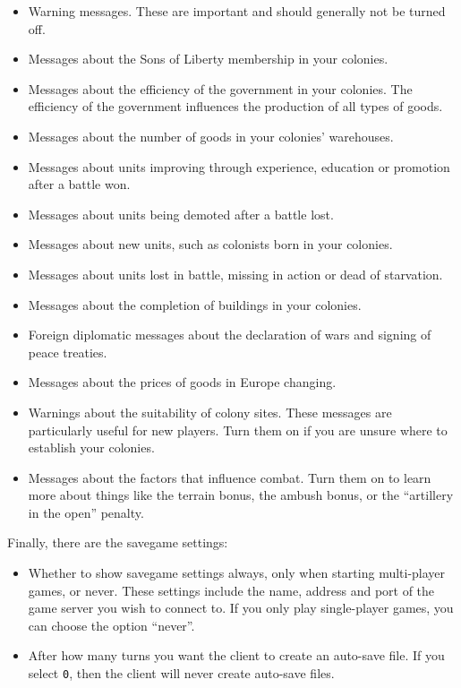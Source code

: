\documentclass[12pt]{article}
\begin{document}
\begin{itemize}
\item Warning messages. These are important and should generally not
be turned off.
\item Messages about the Sons of Liberty membership in your colonies.
\item Messages about the efficiency of the government in your
colonies. The efficiency of the government influences the production
of all types of goods.
\item Messages about the number of goods in your colonies'
warehouses. 
\item Messages about units improving through experience, education or
promotion after a battle won.
\item Messages about units being demoted after a battle lost.
\item Messages about new units, such as colonists born in your
colonies.
\item Messages about units lost in battle, missing in action or dead
of starvation.
\item Messages about the completion of buildings in your colonies.
\item Foreign diplomatic messages about the declaration of wars and
signing of peace treaties.
\item Messages about the prices of goods in Europe changing.
\item Warnings about the suitability of colony sites. These messages
  are particularly useful for new players. Turn them on if you are
  unsure where to establish your colonies.
\item Messages about the factors that influence combat. Turn them on
to learn more about things like the terrain bonus, the ambush bonus,
or the ``artillery in the open'' penalty.
\end{itemize}

Finally, there are the savegame settings:

\begin{itemize}
\item Whether to \hypertarget{show savegame settings}{show savegame
settings} always, only when starting multi-player games, or
never. These settings include the name, address and port of the game
server you wish to connect to. If you only play single-player games,
you can choose the option ``never''.
\item After how many turns you want the client to create an auto-save
file. If you select \verb$0$, then the client will never create
auto-save files.
\end{itemize}
\end{document}
